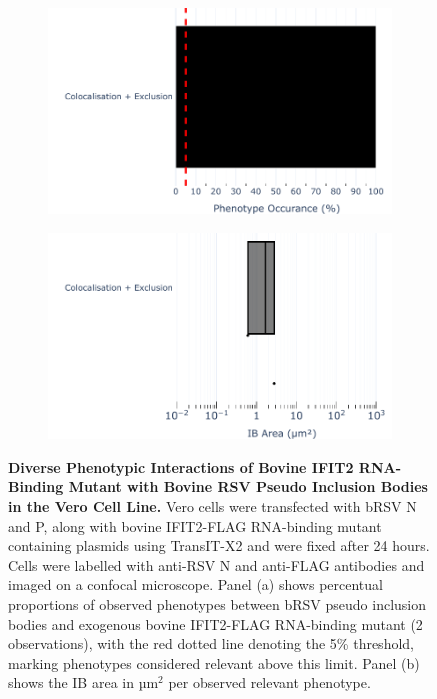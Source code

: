 \begin{figure}
    \begin{subfigure}{0.495\textwidth}
        \caption{}
        \includegraphics[width=1\linewidth]{09. Chapter 4/Figs/01. pIB/03. IFIT2/05. IFIT2-RNA binding mutant/02. pIB/04. bar_bi2f24_bnbp.pdf} 
    \end{subfigure}
    \begin{subfigure}{0.495\textwidth}
        \caption{}
        \includegraphics[width=1\linewidth]{09. Chapter 4/Figs/01. pIB/03. IFIT2/05. IFIT2-RNA binding mutant/02. pIB/05. box_bi2f24_bnbp.pdf}
    \end{subfigure}
    \caption[Diverse Phenotypic Interactions of Bovine IFIT2 RNA-Binding Mutant with Bovine RSV Pseudo Inclusion Bodies in the Vero Cell Line.]{\textbf{Diverse Phenotypic Interactions of Bovine IFIT2 RNA-Binding Mutant with Bovine RSV Pseudo Inclusion Bodies in the Vero Cell Line.} Vero cells were transfected with bRSV N and P, along with bovine IFIT2-FLAG RNA-binding mutant containing plasmids using TransIT-X2 and were fixed after 24 hours. Cells were labelled with anti-RSV N and anti-FLAG antibodies and imaged on a confocal microscope. Panel (a) shows percentual proportions of observed phenotypes between bRSV pseudo inclusion bodies and exogenous bovine IFIT2-FLAG RNA-binding mutant (2 observations), with the red dotted line denoting the 5\% threshold, marking phenotypes considered relevant above this limit. Panel (b) shows the IB area in \(\mbox{µm}^2\) per observed relevant phenotype.}
    \label{fig:Diverse Phenotypic Interactions of Bovine IFIT2 RNA-Binding Mutant with Bovine RSV Pseudo Inclusion Bodies in the Vero Cell Line}
\end{figure}

